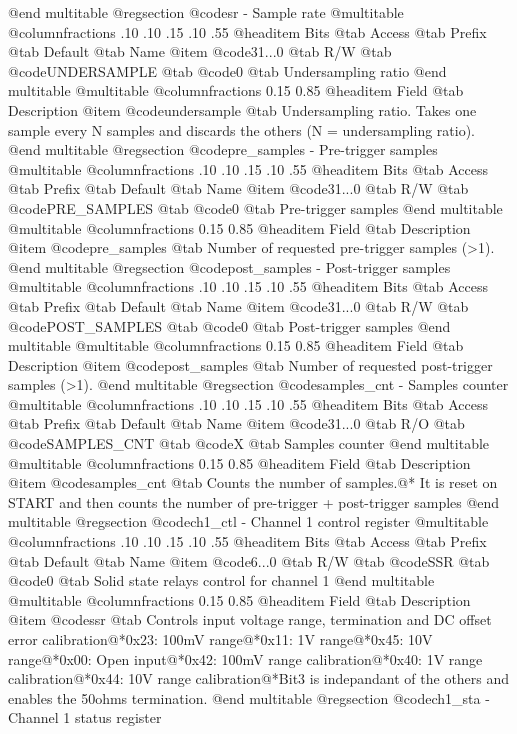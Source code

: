 @end multitable
@regsection @code{sr} - Sample rate
@multitable @columnfractions .10 .10 .15 .10 .55
@headitem Bits @tab Access @tab Prefix @tab Default @tab Name
@item @code{31...0}
@tab R/W @tab
@code{UNDERSAMPLE}
@tab @code{0} @tab 
Undersampling ratio
@end multitable
@multitable @columnfractions 0.15 0.85
@headitem Field @tab Description
@item @code{undersample} @tab Undersampling ratio. Takes one sample every N samples and discards the others (N = undersampling ratio).
@end multitable
@regsection @code{pre_samples} - Pre-trigger samples
@multitable @columnfractions .10 .10 .15 .10 .55
@headitem Bits @tab Access @tab Prefix @tab Default @tab Name
@item @code{31...0}
@tab R/W @tab
@code{PRE_SAMPLES}
@tab @code{0} @tab 
Pre-trigger samples
@end multitable
@multitable @columnfractions 0.15 0.85
@headitem Field @tab Description
@item @code{pre_samples} @tab Number of requested pre-trigger samples (>1).
@end multitable
@regsection @code{post_samples} - Post-trigger samples
@multitable @columnfractions .10 .10 .15 .10 .55
@headitem Bits @tab Access @tab Prefix @tab Default @tab Name
@item @code{31...0}
@tab R/W @tab
@code{POST_SAMPLES}
@tab @code{0} @tab 
Post-trigger samples
@end multitable
@multitable @columnfractions 0.15 0.85
@headitem Field @tab Description
@item @code{post_samples} @tab Number of requested post-trigger samples (>1).
@end multitable
@regsection @code{samples_cnt} - Samples counter
@multitable @columnfractions .10 .10 .15 .10 .55
@headitem Bits @tab Access @tab Prefix @tab Default @tab Name
@item @code{31...0}
@tab R/O @tab
@code{SAMPLES_CNT}
@tab @code{X} @tab 
Samples counter
@end multitable
@multitable @columnfractions 0.15 0.85
@headitem Field @tab Description
@item @code{samples_cnt} @tab Counts the number of samples.@* It is reset on START and then counts the number of pre-trigger + post-trigger samples
@end multitable
@regsection @code{ch1_ctl} - Channel 1 control register
@multitable @columnfractions .10 .10 .15 .10 .55
@headitem Bits @tab Access @tab Prefix @tab Default @tab Name
@item @code{6...0}
@tab R/W @tab
@code{SSR}
@tab @code{0} @tab 
Solid state relays control for channel 1
@end multitable
@multitable @columnfractions 0.15 0.85
@headitem Field @tab Description
@item @code{ssr} @tab Controls input voltage range, termination and DC offset error calibration@*0x23: 100mV range@*0x11: 1V range@*0x45: 10V range@*0x00: Open input@*0x42: 100mV range calibration@*0x40: 1V range calibration@*0x44: 10V range calibration@*Bit3 is indepandant of the others and enables the 50ohms termination.
@end multitable
@regsection @code{ch1_sta} - Channel 1 status register
